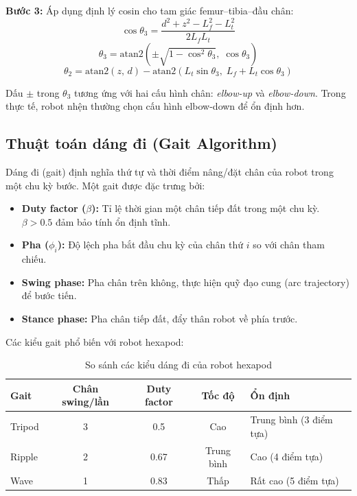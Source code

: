         \textbf{Bước 3:} Áp dụng định lý cosin cho tam giác femur--tibia--đầu chân:
        \begin{equation}
            \cos\theta_3 = \frac{d^2 + z^2 - L_f^2 - L_t^2}{2 L_f L_t}
        \end{equation}
        \begin{equation}
            \theta_3 = \text{atan2}\!\left(\pm\sqrt{1 - \cos^2\theta_3},\; \cos\theta_3\right)
        \end{equation}
        \begin{equation}
            \theta_2 = \text{atan2}(z,\, d) - \text{atan2}\!\left(L_t \sin\theta_3,\; L_f + L_t \cos\theta_3\right)
        \end{equation}

        Dấu $\pm$ trong $\theta_3$ tương ứng với hai cấu hình chân: \textit{elbow-up} và \textit{elbow-down}. Trong thực tế, robot nhện thường chọn cấu hình elbow-down để ổn định hơn.

        \subsection{Thuật toán dáng đi (Gait Algorithm)}

        \hspace{0.5cm} Dáng đi (gait) định nghĩa thứ tự và thời điểm nâng/đặt chân của robot trong một chu kỳ bước. Một gait được đặc trưng bởi:

        \begin{itemize}
            \item \textbf{Duty factor ($\beta$):} Tỉ lệ thời gian một chân tiếp đất trong một chu kỳ. $\beta > 0.5$ đảm bảo tính ổn định tĩnh.
            \item \textbf{Pha ($\phi_i$):} Độ lệch pha bắt đầu chu kỳ của chân thứ $i$ so với chân tham chiếu.
            \item \textbf{Swing phase:} Pha chân trên không, thực hiện quỹ đạo cung (arc trajectory) để bước tiến.
            \item \textbf{Stance phase:} Pha chân tiếp đất, đẩy thân robot về phía trước.
        \end{itemize}

        Các kiểu gait phổ biến với robot hexapod:

        \begin{table}[h!]
        \centering
        \caption{So sánh các kiểu dáng đi của robot hexapod}
        \label{tab:gait_compare}
        \begin{tabular}{|l|c|c|c|l|}
        \hline
        \textbf{Gait} & \textbf{Chân swing/lần} & \textbf{Duty factor} & \textbf{Tốc độ} & \textbf{Ổn định} \\
        \hline
        Tripod  & 3 & 0.5 & Cao   & Trung bình (3 điểm tựa) \\
        Ripple  & 2 & 0.67 & Trung bình & Cao (4 điểm tựa) \\
        Wave    & 1 & 0.83 & Thấp  & Rất cao (5 điểm tựa) \\
        \hline
        \end{tabular}
        \end{table}

